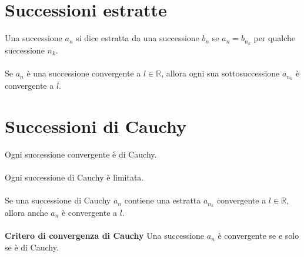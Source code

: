 \documentclass{article}
\begin{document}
\section*{Successioni estratte}
Una successione $a_n$ si dice estratta da una successione $b_n$ se $a_n=b_{n_k}$ per qualche successione $n_k$.\\\\
Se $a_n$ è una successione convergente a $l\in\mathbb{R}$, allora ogni sua sottosuccessione $a_{n_k}$ è convergente a $l$.
\section*{Successioni di Cauchy}
Ogni successione convergente è di Cauchy.\\\\
Ogni successione di Cauchy è limitata.\\\\
Se una successione di Cauchy $a_n$ contiene una estratta $a_{n_k}$ convergente a $l\in\mathbb{R}$, allora anche $a_n$ è convergente a $l$.\\\\
\textbf{Critero di convergenza di Cauchy} Una successione $a_n$ è convergente se e solo se è di Cauchy.
\end{document}
